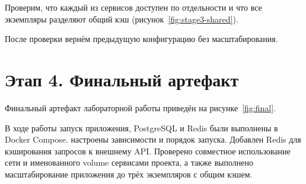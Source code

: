 Проверим, что каждый из сервисов доступен по отдельности и что все
экземпляры разделяют общий кэш (рисунок~\ref{fig:stage3-shared}).


После проверки вернём предыдущую конфигурацию без масштабирования.

\section{Этап 4. Финальный артефакт}

Финальный артефакт лабораторной работы приведён на
рисунке~\ref{fig:final}.



В ходе работы запуск приложения, PostgreSQL и Redis были выполнены в
Docker Compose. настроены зависимости и порядок запуска. Добавлен
Redis для кэширования запросов к внешнему API. Проверено совместное
использование сети и именованного volume сервисами проекта, а также
выполнено масштабирование приложения до трёх экземпляров с общим кэшем.